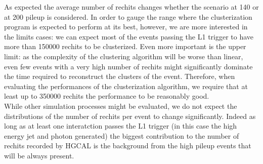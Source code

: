 As expected the average number of rechits changes whether the scenario at 140 or at 200 pileup is considered. In order to gauge the range where the clusterization program is expected to perform at its best, however, we are more interested in the limits cases: we can expect most of the events passing the L1 trigger to have more than 150000 rechits to be clusterized. Even more important is the upper limit: as the complexity of the clustering algorithm will be worse than linear, even few events with a very high number of rechits might significantly dominate the time required to reconstruct the clusters of the event. Therefore, when evaluating the performances of the clusterization algorithm, we require that at least up to 350000 rechits the performance to be reasonably good.\\
While other simulation processes might be evaluated, we do not expect the distributions of the number of rechits per event to change significantly. Indeed as long as at least one interatction passes the L1 trigger (in this case the high energy jet and photon generated) the biggest contribution to the number of rechits recorded by HGCAL is the background from the high pileup events that will be always present.
